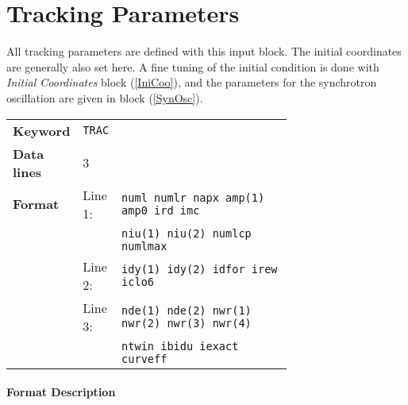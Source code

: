 \section{Tracking Parameters} \label{TraPar}

All tracking parameters are defined with this input block.
The initial coordinates are generally also set here.
A fine tuning of the initial condition is done with \textit{Initial Coordinates} block (\ref{IniCoo}), and the parameters for the synchrotron oscillation are given in block (\ref{SynOsc}).

\bigskip
\begin{tabular}{@{}llp{0.7\linewidth}}
    \textbf{Keyword}    & \texttt{TRAC}\index{TRAC} &\\
    \textbf{Data lines} & 3 &\\
    \textbf{Format}     & Line 1: & \texttt{numl numlr napx amp(1) amp0 ird imc} \\
                        &         & \texttt{niu(1) niu(2) numlcp numlmax} \\
                        & Line 2: & \texttt{idy(1) idy(2) idfor irew iclo6} \\
                        & Line 3: & \texttt{nde(1) nde(2) nwr(1) nwr(2) nwr(3) nwr(4)} \\
                        &         & \texttt{ntwin ibidu iexact curveff}
\end{tabular}

\paragraph{Format Description}~

